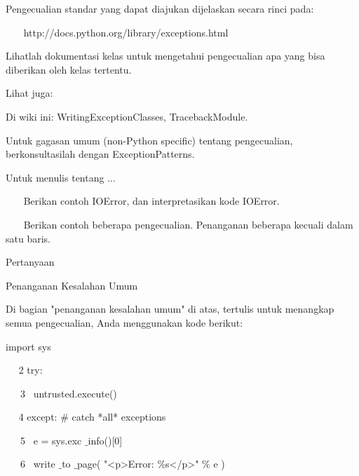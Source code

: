 \vspace{12pt}
Pengecualian standar yang dapat diajukan dijelaskan secara rinci pada: \par
\vspace{12pt}
~~~ http://docs.python.org/library/exceptions.html \par
\vspace{12pt}
Lihatlah dokumentasi kelas untuk mengetahui pengecualian apa yang bisa diberikan oleh kelas tertentu. \par
\vspace{12pt}
Lihat juga: \par
\vspace{12pt}
Di wiki ini: WritingExceptionClasses, TracebackModule. \par
\vspace{12pt}
Untuk gagasan umum (non-Python specific) tentang pengecualian, berkonsultasilah dengan ExceptionPatterns. \par
\vspace{12pt}
Untuk menulis tentang ... \par
\vspace{12pt}
~~~ Berikan contoh IOError, dan interpretasikan kode IOError. \par
~~~ Berikan contoh beberapa pengecualian. Penanganan beberapa kecuali dalam satu baris. \par
\vspace{12pt}
Pertanyaan \par
\vspace{12pt}
Penanganan Kesalahan Umum \par
\vspace{12pt}
Di bagian "penanganan kesalahan umum" di atas, tertulis untuk menangkap semua pengecualian, Anda menggunakan kode berikut: \par
\vspace{12pt}
import sys \par
~~ 2 try: \par
\vspace{12pt}
~~~3~  untrusted.execute() \par
\vspace{12pt}
~~ 4 except:  $  \#  $ catch *all* exceptions \par
\vspace{12pt}
~~~5~  e = sys.exc $  \_  $info()[0] \par
\vspace{12pt}
~~~6~  write $  \_  $to $  \_  $page( "<p>Error:  $  \%  $s</p>"  $  \%  $ e ) \par
